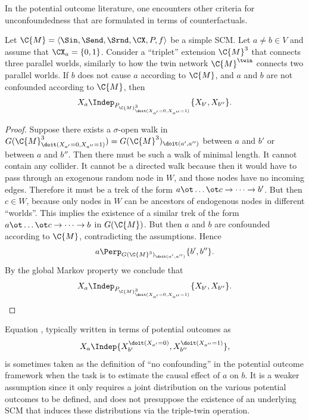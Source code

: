 In the potential outcome literature, one encounters other criteria for unconfoundedness that are formulated in terms 
of counterfactuals.
\begin{Prp}\label{prp:potential_outcome_unconfoundedness}
Let $\C{M} = \langle \Sin, \Send, \Srnd, \CX, P, f \rangle$ be a simple SCM.
Let $a \ne b \in V$ and assume that $\CX_a = \{0,1\}$. Consider a ``triplet'' extension $\C{M}^3$
that connects three parallel worlds, similarly to how the twin network $\C{M}^\twin$ connects two
parallel worlds.
If $b$ does not cause $a$ according to $\C{M}$, and $a$ and $b$ are not confounded according to $\C{M}$, then
  \begin{equation}\label{eq:potential_outcome_unconfoundedness}
    X_a \Indep_{P_{\C{M}^3_{\doit(X_{a'}=0,X_{a''}=1)}}} \{X_{b'}, X_{b''}\}.
  \end{equation}
\end{Prp}
\begin{proof}
  Suppose there exists a $\sigma$-open walk in $G(\C{M}^3_{\doit(X_{a'}=0,X_{a''}=1)}) = G(\C{M}^3)_{\doit(a',a'')}$
  between $a$ and $b'$ or between $a$ and $b''$. Then there must be such a walk of minimal length.
  It cannot contain any collider. It cannot be a directed walk
  because then it would have to pass through an exogenous random node in $W$, and those nodes have no incoming edges. 
  Therefore it must be a trek of the form $a \ot \dots \ot c \to \dots \to b'$.
  But then $c \in W$, because only nodes in $W$ can be ancestors of endogenous nodes in different ``worlds''.
  This implies the existence of a similar trek of the form $a \ot \dots \ot c \to \dots \to b$ in $G(\C{M})$. 
  But then $a$ and $b$ are confounded according to $\C{M}$, contradicting the assumptions.
  Hence 
  $$a \Perp_{G(\C{M}^3)_{\doit(a',a'')}} \{b',b''\}.$$
  By the global Markov property we conclude that
  $$X_a \Indep_{P_{\C{M}^3_{\doit(X_{a'}=0,X_{a''}=1)}}} \{X_{b'}, X_{b''}\}.$$
\end{proof}
Equation , typically written in terms of potential outcomes as
  $$X_a \Indep \{X_{b'}^{\doit(X_{a'}=0)}, X_{b''}^{\doit(X_{a''}=1)}\},$$
is sometimes taken as the definition of ``no confounding'' in the potential outcome framework when
the task is to estimate the causal effect of $a$ on $b$. It is a weaker assumption
since it only requires a joint distribution on the various potential outcomes to be defined, and does not
presuppose the existence of an underlying SCM that induces these distributions via the triple-twin operation.

